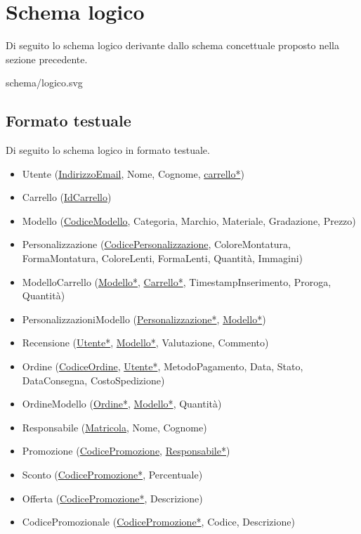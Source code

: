 \section{Schema logico}
Di seguito lo schema logico derivante dallo schema concettuale proposto nella sezione precedente.

\begin{center}
	 {schema/logico.svg}
\end{center}

\subsection{Formato testuale}
Di seguito lo schema logico in formato testuale.
\begin{itemize}
	\item Utente (\underline{IndirizzoEmail}, Nome, Cognome, \underline{carrello*})
	\item Carrello (\underline{IdCarrello})
	\item Modello (\underline{CodiceModello}, Categoria, Marchio, Materiale, Gradazione, Prezzo)
	\item Personalizzazione (\underline{CodicePersonalizzazione}, ColoreMontatura, FormaMontatura,
	      ColoreLenti, FormaLenti, Quantità, Immagini)
	\item ModelloCarrello (\underline{Modello*}, \underline{Carrello*}, TimestampInserimento,
	      Proroga, Quantità)
	\item PersonalizzazioniModello (\underline{Personalizzazione*}, \underline{Modello*})
	\item Recensione (\underline{Utente*}, \underline{Modello*}, Valutazione, Commento)
	\item Ordine (\underline{CodiceOrdine}, \underline{Utente*}, MetodoPagamento, Data, Stato,
	      DataConsegna, CostoSpedizione)
	\item OrdineModello (\underline{Ordine*}, \underline{Modello*}, Quantità)
	\item Responsabile (\underline{Matricola}, Nome, Cognome)
	\item Promozione (\underline{CodicePromozione}, \underline{Responsabile*})
	\item Sconto (\underline{CodicePromozione*}, Percentuale)
	\item Offerta (\underline{CodicePromozione*}, Descrizione)
	\item CodicePromozionale (\underline{CodicePromozione*}, Codice, Descrizione)
\end{itemize}


